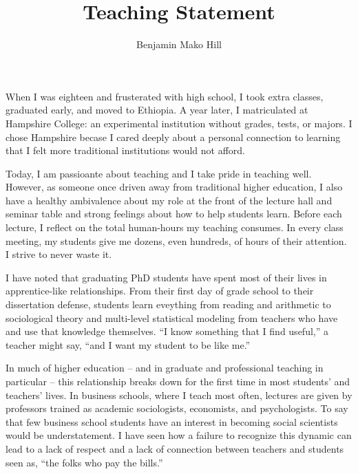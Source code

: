 \documentclass[10pt]{memoir}
\begin{document}
\setlength{\parskip}{4.5pt}

\baselineskip 14.5pt

\title{Teaching Statement}
\author{Benjamin Mako Hill}
\date{}


\maketitle

When I was eighteen and frusterated with high school, I took extra
classes, graduated early, and moved to Ethiopia. A year later, I
matriculated at Hampshire College: an experimental institution without
grades, tests, or majors. I chose Hampshire becase I cared deeply
about a personal connection to learning that I felt more traditional
institutions would not afford.

Today, I am passioante about teaching and I take pride in teaching
well. However, as someone once driven away from traditional higher
education, I also have a healthy ambivalence about my role at the
front of the lecture hall and seminar table and strong feelings about
how to help students learn.  Before each lecture, I reflect on the
total human-hours my teaching consumes. In every class meeting, my
students give me dozens, even hundreds, of hours of their attention. I
strive to never waste it.

I have noted that graduating PhD students have spent most of their
lives in apprentice-like relationships. From their first day of grade
school to their dissertation defense, students learn eveything from
reading and arithmetic to sociological theory and multi-level
statistical modeling from teachers who have and use that knowledge
themselves.  ``I know something that I find useful,'' a teacher might
say, ``and I want my student to be like me.''

In much of higher education -- and in graduate and professional
teaching in particular -- this relationship breaks down for the first
time in most students' and teachers' lives. In business schools, where
I teach most often, lectures are given by professors trained as
academic sociologists, economists, and psychologists.  To say that few
business school students have an interest in becoming social
scientists would be understatement. I have seen how a failure to
recognize this dynamic can lead to a lack of respect and a lack of
connection between teachers and students seen as, ``the folks who pay
the bills.''
\end{document}
